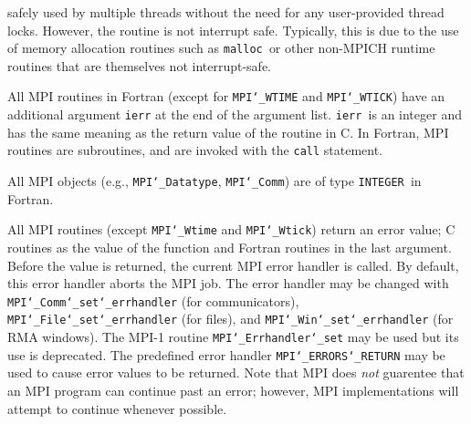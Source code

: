 safely used by multiple threads without the need for any user-provided
thread locks.  However, the routine is not interrupt safe.  Typically,
this is due to the use of memory allocation routines such as {\tt malloc
}or other non-MPICH runtime routines that are themselves not interrupt-safe.
\par
{}
All MPI routines in Fortran (except for {\tt MPI{\tt \char`\_}WTIME} and {\tt MPI{\tt \char`\_}WTICK}) have
an additional argument {\tt ierr} at the end of the argument list.  {\tt ierr
}is an integer and has the same meaning as the return value of the routine
in C.  In Fortran, MPI routines are subroutines, and are invoked with the
{\tt call} statement.
\par
All MPI objects (e.g., {\tt MPI{\tt \char`\_}Datatype}, {\tt MPI{\tt \char`\_}Comm}) are of type {\tt INTEGER
}in Fortran.
\par
{}
\par
All MPI routines (except {\tt MPI{\tt \char`\_}Wtime} and {\tt MPI{\tt \char`\_}Wtick}) return an error value;
C routines as the value of the function and Fortran routines in the last
argument.  Before the value is returned, the current MPI error handler is
called.  By default, this error handler aborts the MPI job.  The error handler
may be changed with {\tt MPI{\tt \char`\_}Comm{\tt \char`\_}set{\tt \char`\_}errhandler} (for communicators),
{\tt MPI{\tt \char`\_}File{\tt \char`\_}set{\tt \char`\_}errhandler} (for files), and {\tt MPI{\tt \char`\_}Win{\tt \char`\_}set{\tt \char`\_}errhandler} (for
RMA windows).  The MPI-1 routine {\tt MPI{\tt \char`\_}Errhandler{\tt \char`\_}set} may be used but
its use is deprecated.  The predefined error handler
{\tt MPI{\tt \char`\_}ERRORS{\tt \char`\_}RETURN} may be used to cause error values to be returned.
Note that MPI does {\em not} guarentee that an MPI program can continue past
an error; however, MPI implementations will attempt to continue whenever
possible.
\par
{}
